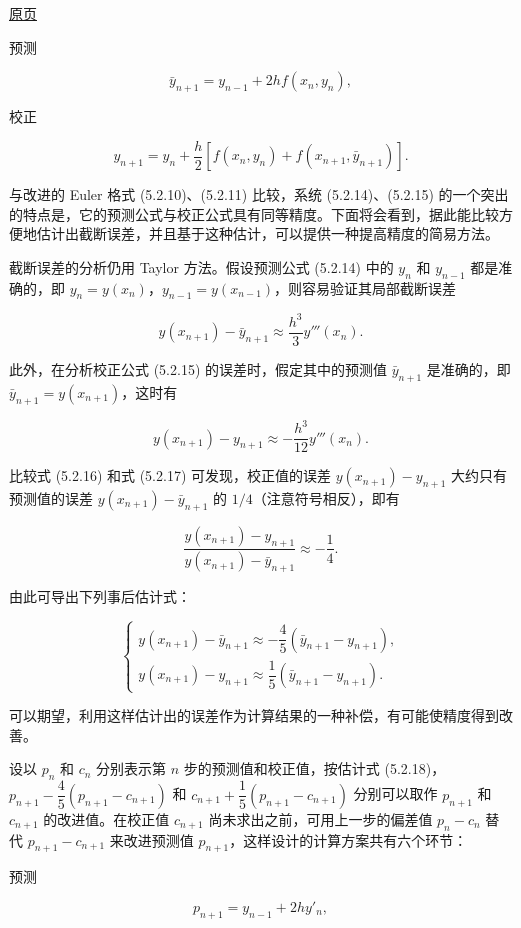 \documentclass[
  10pt,
  fontset=fandol]{ctexart}
\begin{document}
\href{../../source-images/pdf-125.jpeg}{原页}

预测

\[
\bar y_{n+1}=y_{n-1}+2hf(x_n,y_n),\tag{5.2.14}
\]

校正

\[
y_{n+1}=y_n+\frac{h}{2}[f(x_n,y_n)+f(x_{n+1},\bar y_{n+1})].\tag{5.2.15}
\]

与改进的 Euler 格式 (5.2.10)、(5.2.11) 比较，系统 (5.2.14)、(5.2.15) 的一个突出的特点是，它的预测公式与校正公式具有同等精度。下面将会看到，据此能比较方便地估计出截断误差，并且基于这种估计，可以提供一种提高精度的简易方法。

截断误差的分析仍用 Taylor 方法。假设预测公式 (5.2.14) 中的 \(y_n\) 和 \(y_{n-1}\) 都是准确的，即 \(y_n=y(x_n)\)，\(y_{n-1}=y(x_{n-1})\)，则容易验证其局部截断误差

\[
y(x_{n+1})-\bar y_{n+1}\approx\frac{h^3}{3}y'''(x_n).\tag{5.2.16}
\]

此外，在分析校正公式 (5.2.15) 的误差时，假定其中的预测值 \(\bar y_{n+1}\) 是准确的，即 \(\bar y_{n+1}=y(x_{n+1})\)，这时有

\[
y(x_{n+1})-y_{n+1}\approx-\frac{h^3}{12}y'''(x_n).\tag{5.2.17}
\]

比较式 (5.2.16) 和式 (5.2.17) 可发现，校正值的误差 \(y(x_{n+1})-y_{n+1}\) 大约只有预测值的误差 \(y(x_{n+1})-\bar y_{n+1}\) 的 \(1/4\)（注意符号相反），即有

\[
\frac{y(x_{n+1})-y_{n+1}}{y(x_{n+1})-\bar y_{n+1}}\approx-\frac{1}{4}.
\]

由此可导出下列事后估计式：

\[
\begin{cases}
y(x_{n+1})-\bar y_{n+1}\approx-\dfrac{4}{5}(\bar y_{n+1}-y_{n+1}),\\
y(x_{n+1})-y_{n+1}\approx\dfrac{1}{5}(\bar y_{n+1}-y_{n+1}).
\end{cases}\tag{5.2.18}
\]

可以期望，利用这样估计出的误差作为计算结果的一种补偿，有可能使精度得到改善。

设以 \(p_n\) 和 \(c_n\) 分别表示第 \(n\) 步的预测值和校正值，按估计式 (5.2.18)，\(p_{n+1}-\dfrac{4}{5}(p_{n+1}-c_{n+1})\) 和 \(c_{n+1}+\dfrac{1}{5}(p_{n+1}-c_{n+1})\) 分别可以取作 \(p_{n+1}\) 和 \(c_{n+1}\) 的改进值。在校正值 \(c_{n+1}\) 尚未求出之前，可用上一步的偏差值 \(p_n-c_n\) 替代 \(p_{n+1}-c_{n+1}\) 来改进预测值 \(p_{n+1}\)，这样设计的计算方案共有六个环节：

预测

\[
p_{n+1}=y_{n-1}+2hy'_n,
\]
\end{document}
